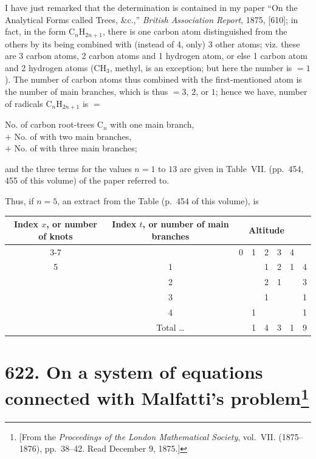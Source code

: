\documentclass[11pt,a4paper]{article}
\theoremstyle{plain}
\theoremstyle{definition}
\theoremstyle{remark}
\begin{document}
I have just remarked that the determination is contained in my paper ``On the Analytical Forms called Trees, \&c.,'' \textit{British Association Report}, 1875, [610]; in fact, in the form C$_n$H$_{2n+1}$, there is one carbon atom distinguished from the others by its being combined with (instead of 4, only) 3 other atoms; viz. these are 3 carbon atoms, 2 carbon atoms and 1 hydrogen atom, or else 1 carbon atom and 2 hydrogen atoms (CH$_3$, methyl, is an exception; but here the number is $=1$). The number of carbon atoms thus combined with the first-mentioned atom is the number of main branches, which is thus $= 3$, $2$, or $1$; hence we have, number of radicals C$_n$H$_{2n+1}$ is $=$
\begin{center}
No. of carbon root-trees C$_n$ with one main branch,\\
$+$ No. of \quad\quad\quad\quad\quad\quad with two main branches,\\
$+$ No. of \quad\quad\quad\quad\quad\quad with three main branches;
\end{center}
and the three terms for the values $n = 1$ to $13$ are given in Table~VII. (pp.~454, 455 of this volume) of the paper referred to.

Thus, if $n = 5$, an extract from the Table (p.~454 of this volume), is

\begin{center}
\begin{tabular}{|c|c|ccccc|c|}
\hline
\multirow{2}{*}{\parbox{1.5cm}{\centering Index $x$, or number of knots}} & \multirow{2}{*}{\parbox{1.5cm}{\centering Index $t$, or number of main branches}} & \multicolumn{5}{c|}{Altitude} & \\\cline{3-7}
& & 0 & 1 & 2 & 3 & 4 & \\
\hline
5 & 1 & & & 1 & 2 & 1 & 4\\
& 2 & & & 2 & 1 & & 3\\
& 3 & & & 1 & & & 1\\
& 4 & & 1 & & & & 1\\
\hline
& Total \ldots & & 1 & 4 & 3 & 1 & 9\\
\hline
\end{tabular}
\end{center}

\newpage
\section[On a system of equations connected with Malfatti's problem]{\textbf{622.} On a system of equations connected with Malfatti's problem\footnote{[From the \textit{Proceedings of the London Mathematical Society}, vol.~VII. (1875--1876), pp.~38--42. Read December 9, 1875.]}}
\end{document}
